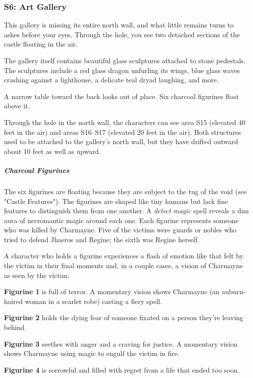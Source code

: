 \documentclass[10pt,a4paper,twoside,bg=print,twocolumn,openany,nodeprecatedcode]{dndbook}
\begin{document}
\subsubsection{S6: Art Gallery}
\begin{DndReadAloud}{}
This gallery is missing its entire north wall, and what little remains turns to ashes before your eyes. Through the hole, you see two detached sections of the castle floating in the air.

The gallery itself contains beautiful glass sculptures attached to stone pedestals. The sculptures include a red glass dragon unfurling its wings, blue glass waves crashing against a lighthouse, a delicate teal dryad laughing, and more.

A narrow table toward the back looks out of place. Six charcoal figurines float above it.

\end{DndReadAloud}

Through the hole in the north wall, the characters can see area S15 (elevated 40 feet in the air) and areas S16–S17 (elevated 20 feet in the air). Both structures used to be attached to the gallery's north wall, but they have drifted outward about 10 feet as well as upward.

\subparagraph{Charcoal Figurines}
The six figurines are floating because they are subject to the tug of the void (see "Castle Features"). The figurines are shaped like tiny humans but lack fine features to distinguish them from one another. A \textit{detect magic} spell reveals a dim aura of necromantic magic around each one. Each figurine represents someone who was killed by Charmayne. Five of the victims were guards or nobles who tried to defend Jhaeros and Regine; the sixth was Regine herself.

A character who holds a figurine experiences a flash of emotion like that felt by the victim in their final moments and, in a couple cases, a vision of Charmayne as seen by the victim:

\textbf{Figurine 1} is full of terror. A momentary vision shows Charmayne (an auburn-haired woman in a scarlet robe) casting a fiery spell.

\textbf{Figurine 2} holds the dying fear of someone fixated on a person they're leaving behind.

\textbf{Figurine 3} seethes with anger and a craving for justice. A momentary vision shows Charmayne using magic to engulf the victim in fire.

\textbf{Figurine 4} is sorrowful and filled with regret from a life that ended too soon.
\end{document}
